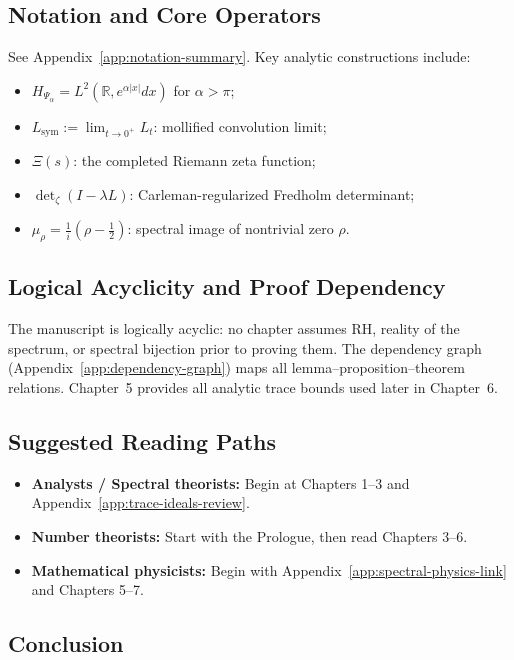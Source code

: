 \subsection*{Notation and Core Operators}

See Appendix~\ref{app:notation-summary}. Key analytic constructions include:
\begin{itemize}
  \item \( H_{\Psi_\alpha} = L^2(\mathbb{R}, e^{\alpha|x|} dx) \) for \( \alpha > \pi \);
  \item \( L_{\mathrm{sym}} := \lim_{t \to 0^+} L_t \): mollified convolution limit;
  \item \( \Xi(s) \): the completed Riemann zeta function;
  \item \( \det\nolimits_\zeta(I - \lambda L) \): Carleman-regularized Fredholm determinant;
  \item \( \mu_\rho = \frac{1}{i}(\rho - \tfrac{1}{2}) \): spectral image of nontrivial zero \( \rho \).
\end{itemize}

\subsection*{Logical Acyclicity and Proof Dependency}

The manuscript is logically acyclic: no chapter assumes RH, reality of the spectrum, or spectral bijection prior to proving them. The dependency graph (Appendix~\ref{app:dependency-graph}) maps all lemma–proposition–theorem relations. Chapter~5 provides all analytic trace bounds used later in Chapter~6.

\subsection*{Suggested Reading Paths}

\begin{itemize}
  \item \textbf{Analysts / Spectral theorists:} Begin at Chapters 1–3 and Appendix~\ref{app:trace-ideals-review}.
  \item \textbf{Number theorists:} Start with the Prologue, then read Chapters 3–6.
  \item \textbf{Mathematical physicists:} Begin with Appendix~\ref{app:spectral-physics-link} and Chapters 5–7.
\end{itemize}

\subsection*{Conclusion}

